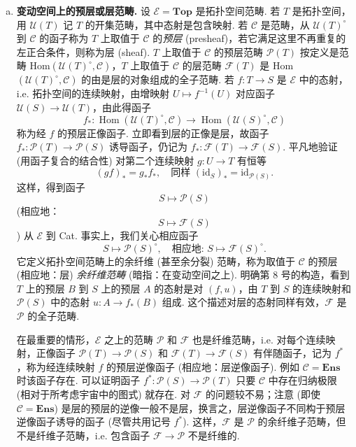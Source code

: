 \begin{enumerate}[a)]
\item \textbf{变动空间上的预层或层范畴.} 设 $\mathcal{E} = \mathbf{Top}$ 是拓扑空间范畴. 若 $T$ 是拓扑空间，用 $\mathcal{U}(T)$ 记 $T$ 的开集范畴，其中态射是包含映射. 若 $\mathcal{C}$ 是范畴，从 $\mathcal{U}(T)^{\circ}$ 到 $\mathcal{C}$ 的函子称为 $T$ 上取值于 $\mathcal{C}$ 的\emph{预层} (presheaf)，若它满足这里不再重复的左正合条件，则称为层 (sheaf). $T$ 上取值于 $\mathcal{C}$ 的预层范畴 $\mathcal{P}(T)$ 按定义是范畴 Hom$(\mathcal{U}(T)^{\circ}, \mathcal{C})$，$T$ 上取值于 $\mathcal{C}$ 的层范畴 $\mathcal{F}(T)$ 是 Hom$(\mathcal{U}(T)^{\circ}, \mathcal{C})$ 的由是层的对象组成的全子范畴. 若 $f \colon T \to S$ 是 $\mathcal{E}$ 中的态射，i.e. 拓扑空间的连续映射，由增映射 $U \mapsto f^{-1}(U)$ 对应函子 $\mathcal{U}(S) \to \mathcal{U}(T)$，由此得函子
\[
f_{*} \colon \operatorname{Hom}(\mathcal{U}(T)^{\circ}, \mathcal{C}) \longrightarrow \operatorname{Hom}(\mathcal{U}(S)^{\circ}, \mathcal{C})
\]
称为经 $f$ 的预层正像函子. 立即看到层的正像是层，故函子 $f_{*} \colon \mathcal{P}(T) \to \mathcal{P}(S)$ 诱导函子，仍记为 $f_{*} \colon \mathcal{F}(T) \to \mathcal{F}(S)$. 平凡地验证 (用函子复合的结合性) 对第二个连续映射 $g \colon U \to T$ 有恒等
\[
(gf)_{*} = g_{*} f_{*}, \quad \text{同样 } (\mathrm{id}_S)_{*} = \mathrm{id}_{\mathcal{P}(S)}.
\]
这样，得到函子
\[
S \longmapsto \mathcal{P}(S)
\]
(相应地：
\[
S \longmapsto \mathcal{F}(S)
\])
从 $\mathcal{E}$ 到 Cat. 事实上，我们关心相应函子
\[
S \longmapsto \mathcal{P}(S)^{\circ}, \quad \text{相应地: } S \longmapsto \mathcal{F}(S)^{\circ}.
\]
它定义拓扑空间范畴上的余纤维 (甚至余分裂) 范畴，称为取值于 $\mathcal{C}$ 的预层 (相应地：层) \emph{余纤维范畴} (暗指：在变动空间之上). 明确第 8 号的构造，看到 $T$ 上的预层 $B$ 到 $S$ 上的预层 $A$ 的态射是对 $(f, u)$，由 $T$ 到 $S$ 的连续映射和 $\mathcal{P}(S)$ 中的态射 $u \colon A \to f_{*}(B)$ 组成. 这个描述对层的态射同样有效，$\mathcal{F}$ 是 $\mathcal{P}$ 的全子范畴.

在最重要的情形，$\mathcal{E}$ 之上的范畴 $\mathcal{P}$ 和 $\mathcal{F}$ 也是纤维范畴，i.e. 对每个连续映射，正像函子 $\mathcal{P}(T) \to \mathcal{P}(S)$ 和 $\mathcal{F}(T) \to \mathcal{F}(S)$ 有伴随函子，记为 $f^{*}$，称为经连续映射 $f$ 的预层逆像函子 (相应地：层逆像函子). 例如 $\mathcal{C} = \mathbf{Ens}$ 时该函子存在. 可以证明函子 $f^{*} \colon \mathcal{P}(S) \to \mathcal{P}(T)$ 只要 $\mathcal{C}$ 中存在归纳极限 (相对于所考虑宇宙中的图式) 就存在. 对 $\mathcal{F}$ 的问题较不易；注意 (即使 $\mathcal{C} = \mathbf{Ens}$) 是层的预层的逆像一般不是层，换言之，层逆像函子不同构于预层逆像函子诱导的函子 (尽管共用记号 $f^{*}$). 这样，$\mathcal{F}$ 是 $\mathcal{P}$ 的余纤维子范畴，但不是纤维子范畴，i.e. 包含函子 $\mathcal{F} \to \mathcal{P}$ 不是纤维的.


\end{enumerate}
